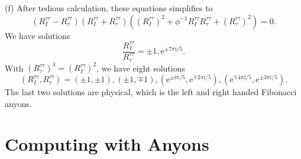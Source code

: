 \documentclass{book}
\begin{document}
(f) After tedious calculation, these equations simplifies to
\begin{equation*}
(R_{I}^{\tau \tau } -R_{\tau }^{\tau \tau } )(R_{I}^{\tau \tau } +R_{\tau }^{\tau \tau } )((R_{I}^{\tau \tau } )^{2} +\phi ^{-1} R_{I}^{\tau \tau } R_{\tau }^{\tau \tau } +(R_{\tau }^{\tau \tau } )^{2} )=0.
\end{equation*}
We have solutions
\begin{equation*}
\frac{R_{I}^{\tau \tau }}{R_{\tau }^{\tau \tau }} =\pm 1,\mathrm{e}^{\pm 7\pi \mathrm{i} /5} .
\end{equation*}
With $(R_{\tau }^{\tau \tau } )^{4} =(R_{I}^{\tau \tau } )^{2}$, we have eight solutions
\begin{equation*}
(R_{I}^{\tau \tau } ,R_{\tau }^{\tau \tau } )=(\pm 1,\pm 1),(\pm 1,\mp 1),(\mathrm{e}^{\pm \mathrm{i} \pi /5} ,\mathrm{e}^{\mp 2\pi \mathrm{i} /5} ),(\mathrm{e}^{\mp 4\pi \mathrm{i} /5} ,\mathrm{e}^{\pm 3\pi \mathrm{i} /5} ).
\end{equation*}
The last two solutions are physical, which is the left and right handed Fibonacci anyons. 

\chapter{Computing with Anyons}




\end{document}

